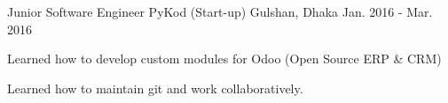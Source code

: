 

\begin{cventries}

  \cventry
    {Junior Software Engineer} %
    {PyKod (Start-up)} %
    {Gulshan, Dhaka} %
    {Jan. 2016 - Mar. 2016} %
    {
      \begin{cvitems} %
        \item {Learned how to develop custom modules for Odoo (Open Source ERP \& CRM)}
        \item {Learned how to maintain git and work collaboratively.}
      \end{cvitems}
    }
\end{cventries}
